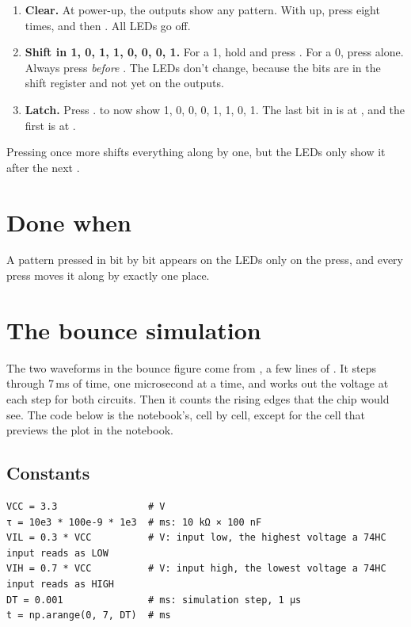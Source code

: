 \documentclass[11pt,a4paper]{article}
\begin{document}
\begin{enumerate}
  \item \textbf{Clear.} At power-up, the outputs show any pattern. With  up, press  eight times, and then . All LEDs go off.
  \item \textbf{Shift in 1, 0, 1, 1, 0, 0, 0, 1.} For a 1, hold  and press . For a 0, press  alone. Always press  \emph{before} . The LEDs don’t change, because the bits are in the shift register and not yet on the outputs.
  \item \textbf{Latch.} Press .  to  now show 1, 0, 0, 0, 1, 1, 0, 1. The last bit in is at , and the first is at .
\end{enumerate}

Pressing  once more shifts everything along by one, but the LEDs only show it after the next .

\section*{Done when}

A pattern pressed in bit by bit appears on the LEDs only on the  press, and every  press moves it along by exactly one place.

\appendix
\section{The bounce simulation}\label{app:simulation}

The two waveforms in the bounce figure come from , a few lines of . It steps through 7\,ms of time, one microsecond at a time, and works out the  voltage at each step for both circuits. Then it counts the rising edges that the chip would see. The code below is the notebook’s, cell by cell, except for the cell that previews the plot in the notebook.

\subsection*{Constants}

\begin{verbatim}
VCC = 3.3                # V
τ = 10e3 * 100e-9 * 1e3  # ms: 10 kΩ × 100 nF
VIL = 0.3 * VCC          # V: input low, the highest voltage a 74HC input reads as LOW
VIH = 0.7 * VCC          # V: input high, the lowest voltage a 74HC input reads as HIGH
DT = 0.001               # ms: simulation step, 1 µs
t = np.arange(0, 7, DT)  # ms
\end{verbatim}
\end{document}
